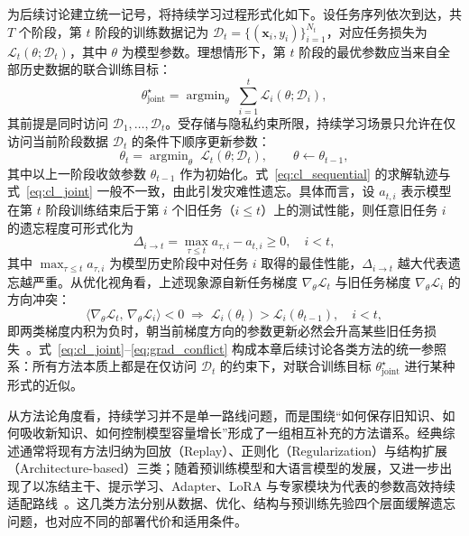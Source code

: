 为后续讨论建立统一记号，将持续学习过程形式化如下。设任务序列依次到达，共 $T$ 个阶段，第 $t$ 阶段的训练数据记为 $\mathcal{D}_t=\{(\mathbf{x}_i,y_i)\}_{i=1}^{N_t}$，对应任务损失为 $\mathcal{L}_t(\theta;\mathcal{D}_t)$，其中 $\theta$ 为模型参数。理想情形下，第 $t$ 阶段的最优参数应当来自全部历史数据的联合训练目标：
\begin{equation}
\theta^{\star}_{\mathrm{joint}}=\mathop{\arg\min}_{\theta}\;\sum_{i=1}^{t}\mathcal{L}_i(\theta;\mathcal{D}_i),
\label{eq:cl_joint}
\end{equation}
其前提是同时访问 $\mathcal{D}_1,\ldots,\mathcal{D}_t$。受存储与隐私约束所限，持续学习场景只允许在仅访问当前阶段数据 $\mathcal{D}_t$ 的条件下顺序更新参数：
\begin{equation}
\theta_t=\mathop{\arg\min}_{\theta}\;\mathcal{L}_t(\theta;\mathcal{D}_t),\qquad \theta\leftarrow\theta_{t-1},
\label{eq:cl_sequential}
\end{equation}
其中以上一阶段收敛参数 $\theta_{t-1}$ 作为初始化。式~\eqref{eq:cl_sequential} 的求解轨迹与式~\eqref{eq:cl_joint} 一般不一致，由此引发灾难性遗忘。具体而言，设 $a_{t,i}$ 表示模型在第 $t$ 阶段训练结束后于第 $i$ 个旧任务（$i\le t$）上的测试性能，则任意旧任务 $i$ 的遗忘程度可形式化为
\begin{equation}
\Delta_{i\to t}=\max_{\tau\le t}a_{\tau,i}-a_{t,i}\ge 0,\quad i<t,
\label{eq:forgetting_def}
\end{equation}
其中 $\max_{\tau\le t}a_{\tau,i}$ 为模型历史阶段中对任务 $i$ 取得的最佳性能，$\Delta_{i\to t}$ 越大代表遗忘越严重。从优化视角看，上述现象源自新任务梯度 $\nabla_\theta\mathcal{L}_t$ 与旧任务梯度 $\nabla_\theta\mathcal{L}_i$ 的方向冲突：
\begin{equation}
\bigl\langle\nabla_\theta\mathcal{L}_t,\,\nabla_\theta\mathcal{L}_i\bigr\rangle<0
\;\Longrightarrow\;
\mathcal{L}_i(\theta_t)>\mathcal{L}_i(\theta_{t-1}),\quad i<t,
\label{eq:grad_conflict}
\end{equation}
即两类梯度内积为负时，朝当前梯度方向的参数更新必然会升高某些旧任务损失~\citep{lopez2017gradient,wang2024survey}。式~\eqref{eq:cl_joint}--\eqref{eq:grad_conflict} 构成本章后续讨论各类方法的统一参照系：所有方法本质上都是在仅访问 $\mathcal{D}_t$ 的约束下，对联合训练目标 $\theta^{\star}_{\mathrm{joint}}$ 进行某种形式的近似。

从方法论角度看，持续学习并不是单一路线问题，而是围绕“如何保存旧知识、如何吸收新知识、如何控制模型容量增长”形成了一组相互补充的方法谱系。经典综述通常将现有方法归纳为回放（Replay）、正则化（Regularization）与结构扩展（Architecture-based）三类；随着预训练模型和大语言模型的发展，又进一步出现了以冻结主干、提示学习、Adapter、LoRA 与专家模块为代表的参数高效持续适配路线~\citep{wang2024survey,zhou2024class,wang2025llm_cl_zh}。这几类方法分别从数据、优化、结构与预训练先验四个层面缓解遗忘问题，也对应不同的部署代价和适用条件。

